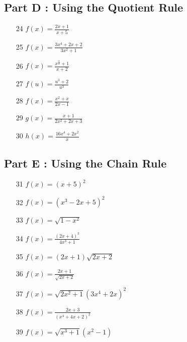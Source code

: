 \documentclass[]{article}
\begin{document}
\subsection*{Part D : Using the Quotient Rule}
{
	\Large
	\begin{multicols}{2}
		\begin{itemize}
			\item[24] $ f(x) = \frac{2x+1}{x+5} $ \,
			\item[25] $ f(x) = \frac{3x^4+2x +2}{3x^2+1} $ \,
			\item[26] $ f(x) = \frac{x^\frac{3}{2}+1}{x+2} $ \,
			\item[27] $ f(u) = \frac{u^3+2}{u^3} $ \,
			\item[28] $ f(x) = \frac{x^2+x}{2x-1} $ \,
			\item[29] $ g(x) = \frac{x+1}{2x^2+2x+3} $ \,
			\item[30] $ h(x) = \frac{16x^4+2x^2}{x} $ \,
			\end{itemize}
			\end{multicols}
		}
\bigskip
\newpage
\subsection*{Part E : Using the Chain Rule}
		{
			\Large
			\begin{multicols}{2}
			\begin{itemize}
			\item[31] $ f(x) = (x+5)^2 $ \,
			\item[32] $ f(x) = (x^3 - 2x + 5)^2 $ \,\,
			\item[33] $ f(x) = \sqrt{1-x^2} $ \, 
			\item[34] $ f(x) = \frac{(2x+4)^3}{4x^3+1} $ \,
			\item[35] $ f(x) = (2x+1)\sqrt{2x+2} $ \,\,
			\item[36] $ f(x) = \frac{2x+1}{\sqrt{2x+2}} $ \,
			\item[37] $ f(x) = \sqrt{2x^2+1}(3x^4+2x)^2 $ \,
			\item[38] $ f(x) = \frac{2x+3}{(x^4+4x+2)^2} $ \,
			\item[39] $ f(x) = \sqrt{x^3+1}(x^2-1) $ \,
		\end{itemize}
	\end{multicols}
}



\end{document}
